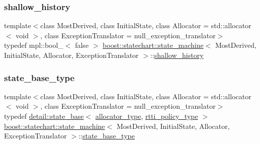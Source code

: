 \subsubsection{\texorpdfstring{shallow\+\_\+history}{shallow\_history}}
{\footnotesize\ttfamily template$<$class Most\+Derived, class Initial\+State, class Allocator = std\+::allocator$<$ void $>$, class Exception\+Translator = null\+\_\+exception\+\_\+translator$>$ \\
typedef mpl\+::bool\+\_\+$<$ false $>$ \mbox{\hyperlink{classboost_1_1statechart_1_1state__machine}{boost\+::statechart\+::state\+\_\+machine}}$<$ Most\+Derived, Initial\+State, Allocator, Exception\+Translator $>$\+::\mbox{\hyperlink{classboost_1_1statechart_1_1state__machine_a2e31e5e73f5e9e5f3714b04eb11cda08}{shallow\+\_\+history}}}

\mbox{\label{classboost_1_1statechart_1_1state__machine_a69cc258c29fcabec25c5dc8bedb7d530}} 
\subsubsection{\texorpdfstring{state\+\_\+base\+\_\+type}{state\_base\_type}}
{\footnotesize\ttfamily template$<$class Most\+Derived, class Initial\+State, class Allocator = std\+::allocator$<$ void $>$, class Exception\+Translator = null\+\_\+exception\+\_\+translator$>$ \\
typedef \mbox{\hyperlink{classboost_1_1statechart_1_1detail_1_1state__base}{detail\+::state\+\_\+base}}$<$ \mbox{\hyperlink{classboost_1_1statechart_1_1state__machine_a7345d6567cd1a829234bbb7f6c0715da}{allocator\+\_\+type}}, \mbox{\hyperlink{classboost_1_1statechart_1_1state__machine_af2a620c579a5248103aee4d3ccb4d632}{rtti\+\_\+policy\+\_\+type}} $>$ \mbox{\hyperlink{classboost_1_1statechart_1_1state__machine}{boost\+::statechart\+::state\+\_\+machine}}$<$ Most\+Derived, Initial\+State, Allocator, Exception\+Translator $>$\+::\mbox{\hyperlink{classboost_1_1statechart_1_1state__machine_a69cc258c29fcabec25c5dc8bedb7d530}{state\+\_\+base\+\_\+type}}}

\mbox{\label{classboost_1_1statechart_1_1state__machine_afe501a67ddcd1da38728f6c672b57198}} 
